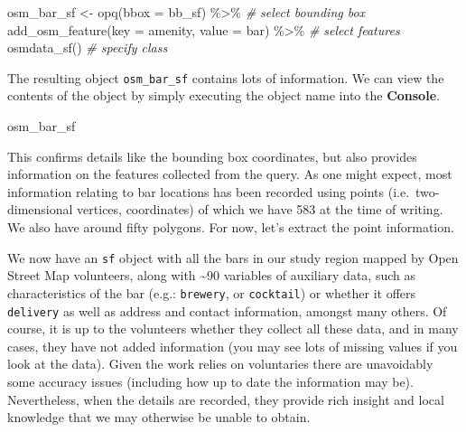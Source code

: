\documentclass[
  krantz2]{krantz}
\makeatletter
\newenvironment{Shaded}{\begin{snugshade}}{\end{snugshade}}
\newcommand{\AttributeTok}[1]{\textcolor[rgb]{0.61,0.61,0.61}{#1}}
\newcommand{\CommentTok}[1]{\textcolor[rgb]{0.37,0.37,0.37}{\textit{#1}}}
\newcommand{\FunctionTok}[1]{\textcolor[rgb]{0,0,0}{#1}}
\newcommand{\NormalTok}[1]{#1}
\newcommand{\OtherTok}[1]{\textcolor[rgb]{0.37,0.37,0.37}{#1}}
\newcommand{\SpecialCharTok}[1]{\textcolor[rgb]{0,0,0}{#1}}
\newcommand{\StringTok}[1]{\textcolor[rgb]{0.5,0.5,0.5}{#1}}
\newenvironment{kframe}{%
\medskip{}
\setlength{\fboxsep}{.8em}
 \def\at@end@of@kframe{}%
 \ifinner\ifhmode%
  \def\at@end@of@kframe{\end{minipage}}%
  \begin{minipage}{\columnwidth}%
 \fi\fi%
 \def\FrameCommand##1{\hskip\@totalleftmargin \hskip-\fboxsep
 \colorbox{shadecolor}{##1}\hskip-\fboxsep
     \hskip-\linewidth \hskip-\@totalleftmargin \hskip\columnwidth}%
 \MakeFramed {\advance\hsize-\width
   \@totalleftmargin\z@ \linewidth\hsize
   \@setminipage}}%
 {\par\unskip\endMakeFramed%
 \at@end@of@kframe}
\renewenvironment{Shaded}{\begin{kframe}}{\end{kframe}}
\makeatother
\begin{document}
\begin{Shaded}
\begin{Highlighting}[]
\NormalTok{osm\_bar\_sf }\OtherTok{\textless{}{-}} \FunctionTok{opq}\NormalTok{(}\AttributeTok{bbox =}\NormalTok{ bb\_sf) }\SpecialCharTok{\%\textgreater{}\%}    \CommentTok{\# select bounding box}
  \FunctionTok{add\_osm\_feature}\NormalTok{(}\AttributeTok{key =} \StringTok{\textquotesingle{}amenity\textquotesingle{}}\NormalTok{, }\AttributeTok{value =} \StringTok{\textquotesingle{}bar\textquotesingle{}}\NormalTok{) }\SpecialCharTok{\%\textgreater{}\%} \CommentTok{\# select features}
  \FunctionTok{osmdata\_sf}\NormalTok{()          }\CommentTok{\# specify class}
\end{Highlighting}
\end{Shaded}

The resulting object \texttt{osm\_bar\_sf} contains lots of information. We can view the contents of the object by simply executing the object name into the \textbf{Console}.

\begin{Shaded}
\begin{Highlighting}[]
\NormalTok{osm\_bar\_sf}
\end{Highlighting}
\end{Shaded}

This confirms details like the bounding box coordinates, but also provides information on the features collected from the query. As one might expect, most information relating to bar locations has been recorded using points (i.e.~two-dimensional vertices, coordinates) of which we have 583 at the time of writing. We also have around fifty polygons. For now, let's extract the point information.

\begin{Shaded}
\end{Shaded}

We now have an \texttt{sf} object with all the bars in our study region mapped by Open Street Map volunteers, along with \textasciitilde90 variables of auxiliary data, such as characteristics of the bar (e.g.: \texttt{brewery}, or \texttt{cocktail}) or whether it offers \texttt{delivery} as well as address and contact information, amongst many others. Of course, it is up to the volunteers whether they collect all these data, and in many cases, they have not added information (you may see lots of missing values if you look at the data). Given the work relies on voluntaries there are unavoidably some accuracy issues (including how up to date the information may be). Nevertheless, when the details are recorded, they provide rich insight and local knowledge that we may otherwise be unable to obtain.
\end{document}
